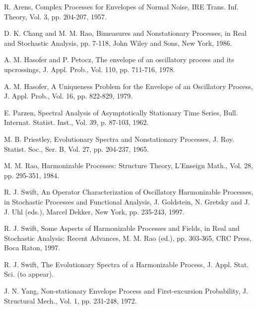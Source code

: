 \documentclass[12pt]{article}
\begin{document}
\begin{thebibliography}{11}
 R. Arens, Complex Processes for Envelopes of Normal Noise, IRE Trans. Inf. Theory, Vol. 3, pp. 204-207, 1957.

 D. K. Chang and M. M. Rao, Bimeasures and Nonstationary Processes, in Real and Stochastic Analysis, pp. 7-118, John Wiley and Sons, New York, 1986.

 A. M. Hasofer and P. Petocz, The envelope of an oscillatory process and its upcrossings, J. Appl. Prob., Vol. 110, pp. 711-716, 1978.

 A. M. Hasofer, A Uniqueness Problem for the Envelope of an Oscillatory Process, J. Appl. Prob., Vol. 16, pp. 822-829, 1979.

 E. Parzen, Spectral Analysis of Asymptotically Stationary Time Series, Bull. Internat. Statist. Inst., Vol. 39, p. 87-103, 1962.

 M. B. Priestley, Evolutionary Spectra and Nonstationary Processes, J. Roy. Statist. Soc., Ser. B, Vol. 27, pp. 204-237, 1965.

 M. M. Rao, Harmonizable Processes: Structure Theory, L'Enseign Math., Vol. 28, pp. 295-351, 1984.

 R. J. Swift, An Operator Characterization of Oscillatory Harmonizable Processes, in Stochastic Processes and Functional Analysis, J. Goldstein, N. Gretsky and J. J. Uhl (eds.), Marcel Dekker, New York, pp. 235-243, 1997.

 R. J. Swift, Some Aspects of Harmonizable Processes and Fields, in Real and Stochastic Analysis: Recent Advances, M. M. Rao (ed.), pp. 303-365, CRC Press, Boca Raton, 1997.

 R. J. Swift, The Evolutionary Spectra of a Harmonizable Process, J. Appl. Stat. Sci. (to appear).

 J. N. Yang, Non-stationary Envelope Process and First-excursion Probability, J. Structural Mech., Vol. 1, pp. 231-248, 1972.
\end{thebibliography}
\end{document}
